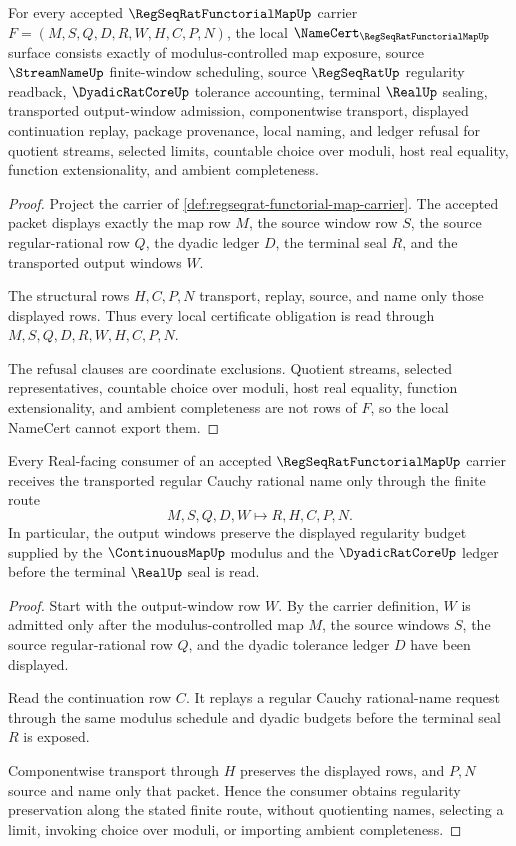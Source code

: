 \begin{theorem}
\label{thm:regseqrat-functorial-map-namecert-obligations}
For every accepted $\RegSeqRatFunctorialMapUp$ carrier $F=(M,S,Q,D,R,W,H,C,P,N)$, the local $\NameCert_{\RegSeqRatFunctorialMapUp}$ surface consists exactly of modulus-controlled map exposure, source $\StreamNameUp$ finite-window scheduling, source $\RegSeqRatUp$ regularity readback, $\DyadicRatCoreUp$ tolerance accounting, terminal $\RealUp$ sealing, transported output-window admission, componentwise transport, displayed continuation replay, package provenance, local naming, and ledger refusal for quotient streams, selected limits, countable choice over moduli, host real equality, function extensionality, and ambient completeness.
\end{theorem}
\begin{proof}
Project the carrier of \autoref{def:regseqrat-functorial-map-carrier}. The accepted packet displays exactly the map row $M$, the source window row $S$, the source regular-rational row $Q$, the dyadic ledger $D$, the terminal seal $R$, and the transported output windows $W$.

The structural rows $H,C,P,N$ transport, replay, source, and name only those displayed rows. Thus every local certificate obligation is read through $M,S,Q,D,R,W,H,C,P,N$.

The refusal clauses are coordinate exclusions. Quotient streams, selected representatives, countable choice over moduli, host real equality, function extensionality, and ambient completeness are not rows of $F$, so the local NameCert cannot export them.
\end{proof}

\begin{theorem}
\label{thm:regseqrat-functorial-map-regularity-preservation}
Every Real-facing consumer of an accepted $\RegSeqRatFunctorialMapUp$ carrier receives the transported regular Cauchy rational name only through the finite route
$$
M,S,Q,D,W \longmapsto R,H,C,P,N .
$$
In particular, the output windows preserve the displayed regularity budget supplied by the $\ContinuousMapUp$ modulus and the $\DyadicRatCoreUp$ ledger before the terminal $\RealUp$ seal is read.
\end{theorem}
\begin{proof}
Start with the output-window row $W$. By the carrier definition, $W$ is admitted only after the modulus-controlled map $M$, the source windows $S$, the source regular-rational row $Q$, and the dyadic tolerance ledger $D$ have been displayed.

Read the continuation row $C$. It replays a regular Cauchy rational-name request through the same modulus schedule and dyadic budgets before the terminal seal $R$ is exposed.

Componentwise transport through $H$ preserves the displayed rows, and $P,N$ source and name only that packet. Hence the consumer obtains regularity preservation along the stated finite route, without quotienting names, selecting a limit, invoking choice over moduli, or importing ambient completeness.
\end{proof}

